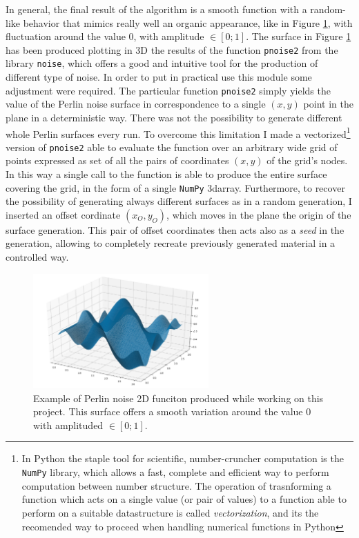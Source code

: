 In general, the final result of the algorithm is a smooth function with a random-like behavior that mimics really well an organic appearance, like in Figure \ref{fig:my_perlin}, with fluctuation around the value 0, with amplitude $ \in [ 0;1] $. The surface in Figure \ref{fig:my_perlin} has been produced plotting in 3D the results of the function \texttt{pnoise2} from the library \texttt{noise}, which offers a good and intuitive tool for the production of different type of noise. In order to put in practical use this module some adjustment were required. The particular function \texttt{pnoise2} simply yields the value of the Perlin noise surface in correspondence to a single $(x,y)$ point in the plane in a deterministic way. There was not the possibility to generate different whole Perlin surfaces every run. To overcome this limitation I made a vectorized\footnote{In Python the staple tool for scientific, number-cruncher computation is the \texttt{NumPy} library, which allows a fast, complete and efficient way to perform computation between number structure. The operation of trasnforming a function which acts on a single value (or pair of values) to a function able to perform on a suitable datastructure is called \textit{vectorization}, and its the recomended way to proceed when handling numerical functions in Python} version of \texttt{pnoise2} able to evaluate the function over an arbitrary wide grid of points expressed as set of all the pairs of coordinates $(x,y)$ of the grid's nodes. In this way a single call to the function is able to produce the entire surface covering the grid, in the form of a single \texttt{NumPy} 3darray. Furthermore, to recover the possibility of generating always different surfaces as in a random generation, I inserted an offset cordinate $(x_O,y_O)$, which moves in the plane the origin of the surface generation. This pair of offset coordinates then acts also as a \textit{seed} in the generation, allowing to completely recreate previously generated material in a controlled way.

\begin{figure}
    \centering
    \includegraphics[width = 0.6\textwidth]{images/perlin}
    \caption{Example of Perlin noise 2D funciton produced while working on this project. This surface offers a smooth variation around the value 0 with amplituded $ \in [ 0;1] $.}
    \label{fig:my_perlin}
\end{figure}

